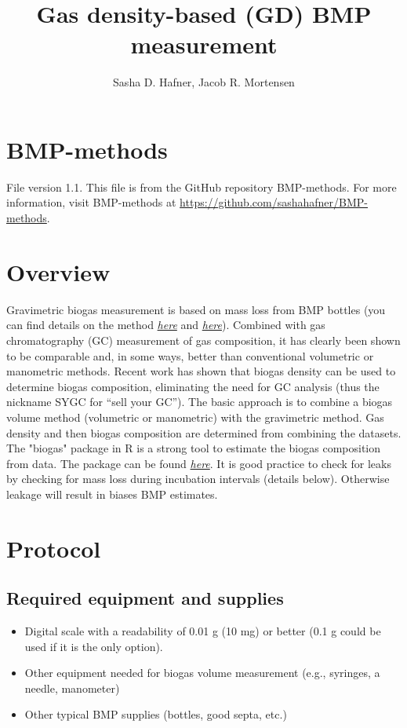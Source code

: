 \documentclass[]{article}
\title {Gas density-based (GD) BMP measurement}
\author{Sasha D. Hafner, Jacob R. Mortensen\\
}
\begin{document}
\maketitle

\section{BMP-methods}
File version 1.1. 
This file is from the GitHub repository BMP-methods.
For more information, visit BMP-methods at \url{https://github.com/sashahafner/BMP-methods}.

\section{Overview}

Gravimetric biogas measurement is based on mass loss from BMP bottles (you can find details on the method \href{https://www.sciencedirect.com/science/article/pii/S0961953415301148}{\textit{here}} and \href{https://iwaponline.com/wpt/article-abstract/13/1/52/38679/Quantification-of-leakage-in-batch-biogas-assays?redirectedFrom=PDF}{\textit{here}}). Combined with gas chromatography (GC) measurement of gas composition, it has clearly been shown to be comparable and, in some ways, better than conventional volumetric or manometric methods. Recent work has shown that biogas density can be used to determine biogas composition, eliminating the need for GC analysis (thus the nickname SYGC for “sell your GC”). The basic approach is to combine a biogas volume method (volumetric or manometric) with the gravimetric method. Gas density and then biogas composition are determined from combining the datasets. The "biogas" package in R is a strong tool to estimate the biogas composition from data. The package can be found \href{https://cran.r-project.org/web/packages/biogas/index.html}{\textit{here}}. It is good practice to check for leaks by checking for mass loss during incubation intervals (details below). Otherwise leakage will result in biases BMP estimates.

\section{Protocol}

\subsection{Required equipment and supplies}

\begin{itemize}
    \item Digital scale with a readability of 0.01 g (10 mg) or better (0.1 g could be used if it is the only option).
    \item Other equipment needed for biogas volume measurement (e.g., syringes, a needle, manometer)
    \item Other typical BMP supplies (bottles, good septa, etc.)
\end{itemize}
\end{document}
